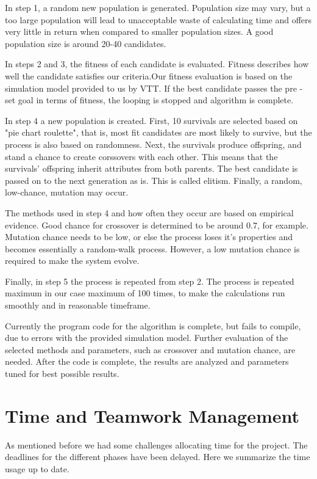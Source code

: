 \documentclass[twoside]{article}
\begin{document}
\begin{multicols}{2}
In step 1, a random new population is generated.  Population size may vary, but a too large population will lead to unacceptable waste of calculating time and offers very little in return when compared to smaller population sizes. A good population size is around 20-40 candidates.

In steps 2 and 3, the fitness of each candidate is evaluated.  Fitness describes how well the candidate satisfies our criteria.Our fitness evaluation is based on the simulation model provided to us by VTT.  If the best candidate passes the pre -set goal in terms of  fitness, the  looping is stopped and algorithm is complete.

In step 4 a new population is created. First, 10 survivals are  selected based on "pie chart roulette", that is, most fit candidates are most likely to survive, but the process is also based on randomness. Next, the survivals produce offspring, and stand a chance to create corssovers with each other. This means that the survivals' offspring inherit attributes from both parents. The best candidate is passed on to the next generation as is. This is called elitism. Finally, a  random, low-chance, mutation may occur.

The methods used in step 4 and how often they occur are based on empirical evidence. Good  chance for crossover is determined to be around 0.7, for example. Mutation chance needs to be low, or else the process loses it's properties and becomes essentially a random-walk process. However, a low mutation chance is required to make the system evolve.

Finally, in step 5 the process is repeated from step 2. The process is repeated maximum in our case maximum of 100 times, to make the calculations run smoothly and in reasonable timeframe.

Currently the program code for the algorithm is complete, but fails to compile, due to errors with the provided simulation model. Further evaluation of the selected methods and parameters, such as crossover and mutation chance, are needed. After the code is complete, the results are analyzed and parameters tuned for best possible results.



\section{Time and Teamwork Management}

As mentioned before we had some challenges allocating time for the project. The deadlines for the different phases have been delayed. Here we summarize the time usage up to date.


\end{multicols}
\end{document}
